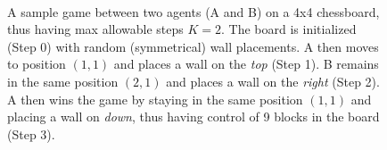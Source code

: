 \documentclass[twoside,11pt]{article}
\begin{document}
\begin{figure}[ht!]%
\centering
{}
 \\
\hfill
{}
\caption{A sample game between two agents (A and B) on a 4x4 chessboard, thus having max allowable steps $K=2$. The board is initialized (Step 0) with random (symmetrical) wall placements. A then moves to position $(1,1)$ and places a wall on the \textit{top} (Step 1). B remains in the same position $(2,1)$ and places a wall on the \textit{right} (Step 2). A then wins the game by staying in the same position $(1,1)$ and placing a wall on \textit{down}, thus having control of 9 blocks in the board (Step 3). }
\label{example_game}
\end{figure}
\end{document}

